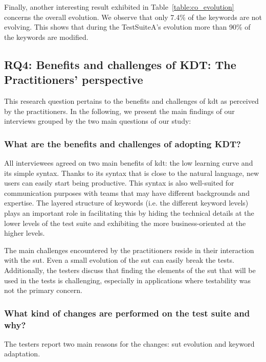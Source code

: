 Finally, another interesting result exhibited in Table~\ref{table:co_evolution} concerns the overall evolution. We observe that only 7.4\% of the keywords are not evolving. This shows that during the TestSuiteA's evolution more than 90\% of the keywords are modified.

\subsection{RQ4: Benefits and challenges of KDT: The Practitioners' perspective}
\label{sec:evolution-results-rq4}

This research question pertains to the benefits and challenges of \gls{kdt} as perceived by the practitioners. In the following, we present the main findings of our interviews grouped by the two main questions of our study:

\subsubsection{What are the benefits and challenges of adopting KDT?}

All interviewees agreed on two main benefits of \gls{kdt}: the low learning curve and its simple syntax. Thanks to its syntax that is close to the natural language, new users can easily start being productive.  This syntax is also well-suited for communication purposes with teams that may have different backgrounds and expertise. The layered structure of keywords (i.e. the different keyword levels) plays an important role in facilitating this by hiding the technical details at the lower levels of the test suite and exhibiting the more business-oriented at the higher levels.

The main challenges encountered by the practitioners reside in their interaction with the \gls{sut}. Even a small evolution of the \gls{sut} can easily break the tests. Additionally, the testers discuss that finding the elements of the \gls{sut} that will be used in the tests is challenging, especially in applications where testability was not the primary concern.

\subsubsection{What kind of changes are performed on the test suite and why?}

The testers report two main reasons for the changes: \gls{sut} evolution and keyword adaptation.

